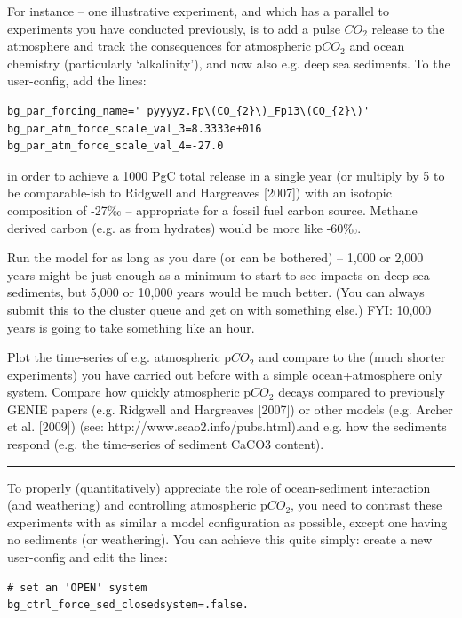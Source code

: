 \documentclass[11pt,fleqn]{book} %
\begin{document}
For instance – one illustrative experiment, and which has a parallel to experiments you have conducted previously, is to add a pulse \(CO_{2}\) release to the atmosphere and track the consequences for atmospheric p\(CO_{2}\) and ocean chemistry (particularly ‘alkalinity’), and now also e.g. deep sea sediments. To the user-config, add the lines:

\begin{verbatim}
bg_par_forcing_name=' pyyyyz.Fp\(CO_{2}\)_Fp13\(CO_{2}\)'
bg_par_atm_force_scale_val_3=8.3333e+016
bg_par_atm_force_scale_val_4=-27.0
\end{verbatim}

in order to achieve a 1000 PgC total release in a single year (or multiply by 5 to be comparable-ish to Ridgwell and Hargreaves [2007]) with an isotopic composition of -27‰ – appropriate for a fossil fuel carbon source. Methane derived carbon (e.g. as from hydrates) would be more like -60‰.

Run the model for as long as you dare (or can be bothered) – 1,000 or 2,000 years might be just enough as a minimum to start to see impacts on deep-sea sediments, but 5,000 or 10,000 years would be much better. (You can always submit this to the cluster queue and get on with something else.) FYI: 10,000 years is going to take something like an hour.

Plot the time-series of e.g. atmospheric p\(CO_{2}\) and compare to the (much shorter experiments) you have carried out before with a simple ocean+atmosphere only system. Compare how quickly atmospheric p\(CO_{2}\) decays compared to previously GENIE papers (e.g. Ridgwell and Hargreaves [2007]) or other models (e.g. Archer et al. [2009]) (see: http://www.seao2.info/pubs.html).and e.g. how the sediments respond (e.g. the time-series of sediment CaCO3 content). 

\vspace{1mm}
\noindent\rule{4cm}{0.1mm}
\vspace{2mm}

To properly (quantitatively) appreciate the role of ocean-sediment interaction (and weathering) and controlling atmospheric p\(CO_{2}\), you need to contrast these experiments with as similar a model configuration as possible, except one having no sediments (or weathering). You can achieve this quite simply: create a new user-config and edit the lines:

\begin{verbatim}
# set an 'OPEN' system
bg_ctrl_force_sed_closedsystem=.false.
\end{verbatim}
\end{document}
